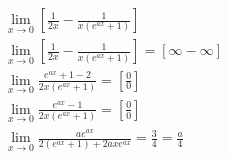 \begin{ex}
\begin{align}
&\lim_{x\rightarrow 0} \left[\frac{1}{2x}-\frac{1}{x(e^{ax}+1)}\right]\nonumber\\
&\lim_{x\rightarrow 0} \left[\frac{1}{2x}-\frac{1}{x(e^{ax}+1)}\right]= [\infty-\infty]\nonumber\\
&\lim_{x\rightarrow 0} \frac{e^{ax}+1-2}{2x(e^{ax}+1)}=\left[\frac{0}{0}\right]\nonumber\\
&\lim_{x\rightarrow 0} \frac{e^{ax}-1}{2x(e^{ax}+1)}=\left[\frac{0}{0}\right]\nonumber\\
&\lim_{x\rightarrow 0} \frac{ae^{ax}}{2(e^{ax}+1)+2axe^{ax}}=\frac{3}{4}=\frac{a}{4}\nonumber
\end{align}
\end{ex}